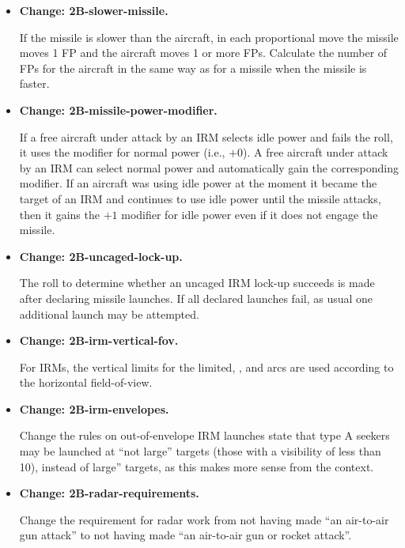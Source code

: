 \documentclass[10pt]{report}
\newcommand{\itemtag}[1]{\item \textbf{Change: #1.}\par}
\begin{document}
\begin{itemize}
    \itemtag{2B-slower-missile} If the missile is slower than the aircraft, in each proportional move the missile moves 1 FP and the aircraft moves 1 or more FPs. Calculate the number of FPs for the aircraft in the same way as for a missile when the missile is faster.
    
    \itemtag{2B-missile-power-modifier} If a free aircraft under attack by an IRM selects idle power and fails the roll, it uses the modifier for normal power (i.e., $+0$). A free aircraft under attack by an IRM can select normal power and automatically gain the corresponding modifier. If an aircraft was using idle power at the moment it became the target of an IRM and continues to use idle power until the missile attacks, then it gains the $+1$ modifier for idle power even if it does not engage the missile.
    
    \itemtag{2B-uncaged-lock-up} The roll to determine whether an uncaged IRM lock-up succeeds is made after declaring missile launches. If all declared launches fail, as usual one additional launch may be attempted.

    \itemtag{2B-irm-vertical-fov} For IRMs, the vertical limits for the limited, , and  arcs are used according to the horizontal field-of-view.

    \itemtag{2B-irm-envelopes} Change the rules on out-of-envelope IRM launches state that type A seekers may be launched at “not large” targets (those with a visibility of less than 10), instead of large” targets, as this makes more sense from the context.

    \itemtag{2B-radar-requirements} Change the requirement for radar work from not having made “an air-to-air gun attack” to not having made “an air-to-air gun or rocket attack”.
    



\end{itemize}
\end{document}
